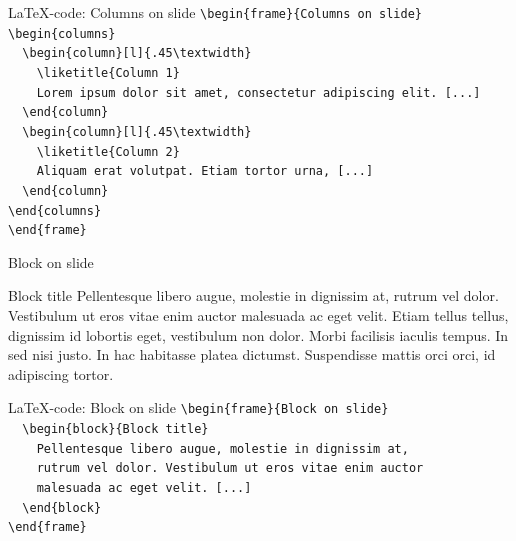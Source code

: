 \documentclass[t,11pt]{beamer}
\def\liketitle#1{%
{\usebeamerfont{frametitle}\usebeamercolor[fg]{frametitle}%
\begin{flushleft}%
\vspace{-\baselineskip}%
#1\par
\end{flushleft}%
\vspace{-\baselineskip}%
}%
\vspace{0.75\baselineskip}%
}
\begin{document}
\toggleslidecolors
\begin{frame}[fragile]{\LaTeX-code: Columns on slide}
\footnotesize
\verb|\begin{frame}{Columns on slide}|\\
\verb|\begin{columns}|\\
\verb|  \begin{column}[l]{.45\textwidth}|\\
\verb|    \liketitle{Column 1}|\\
\verb|    Lorem ipsum dolor sit amet, consectetur adipiscing elit. [...]|\\
\verb|  \end{column}|\\
\verb|  \begin{column}[l]{.45\textwidth}|\\
\verb|    \liketitle{Column 2}|\\
\verb|    Aliquam erat volutpat. Etiam tortor urna, [...]|\\
\verb|  \end{column}|\\
\verb|\end{columns}|\\
\verb|\end{frame}|\\
\end{frame}
\toggleslidecolors

\begin{frame}{Block on slide}
\begin{block}{Block title}
Pellentesque libero augue, molestie in dignissim at, rutrum vel dolor. Vestibulum ut eros vitae enim auctor malesuada ac eget velit. Etiam tellus tellus, dignissim id lobortis eget, vestibulum non dolor. Morbi facilisis iaculis tempus. In sed nisi justo. In hac habitasse platea dictumst. Suspendisse mattis orci orci, id adipiscing tortor.
\end{block}
\end{frame}

\toggleslidecolors
\begin{frame}[fragile]{\LaTeX-code: Block on slide}
\footnotesize
\verb|\begin{frame}{Block on slide}|\\
\verb|  \begin{block}{Block title}|\\
\verb|    Pellentesque libero augue, molestie in dignissim at,|\\
\verb|    rutrum vel dolor. Vestibulum ut eros vitae enim auctor|\\
\verb|    malesuada ac eget velit. [...]|\\
\verb|  \end{block}|\\
\verb|\end{frame}|\\
\end{frame}
\toggleslidecolors
\end{document}
